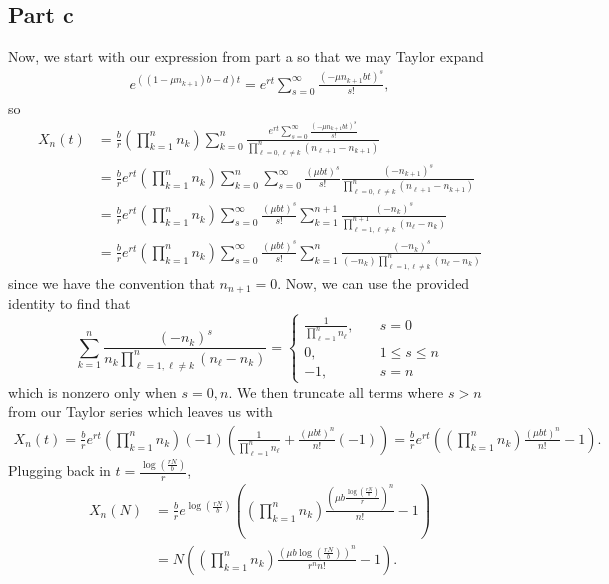 \documentclass{article}
\begin{document}
\subsection{Part c}
Now, we start with our expression from part a so that we may Taylor expand
\begin{align*}
e^{((1-\mu n_{k+1})b-d) t}=e^{rt}\sum_{s=0}^\infty\frac{(-\mu n_{k+1}bt)^s}{s!},
\end{align*}
so
\begin{align*}
X_n(t)&=\frac{b}{r}\left(\prod_{k=1}^{n}n_k\right)\sum_{k=0}^{n}\frac{e^{rt}\sum_{s=0}^\infty\frac{(-\mu n_{k+1}bt)^s}{s!}}{\prod_{\ell=0,\ell\neq k}^{n}(n_{\ell+1}-n_{k+1})}\\&=
\frac{b}{r}e^{rt}\left(\prod_{k=1}^{n}n_k\right)\sum_{k=0}^{n}\sum_{s=0}^\infty\frac{(\mu bt)^s}{s!}\frac{(-n_{k+1})^s}{\prod_{\ell=0,\ell\neq k}^{n}(n_{\ell+1}-n_{k+1})}\\&=
\frac{b}{r}e^{rt}\left(\prod_{k=1}^{n}n_k\right)\sum_{s=0}^\infty\frac{(\mu bt)^s}{s!}\sum_{k=1}^{n+1}\frac{(-n_{k})^s}{\prod_{\ell=1,\ell\neq k}^{n+1}(n_{\ell}-n_{k})}\\&=
\frac{b}{r}e^{rt}\left(\prod_{k=1}^{n}n_k\right)\sum_{s=0}^\infty\frac{(\mu bt)^s}{s!}\sum_{k=1}^{n}\frac{(-n_{k})^{s}}{(-n_k)\prod_{\ell=1,\ell\neq k}^{n}(n_{\ell}-n_{k})}
\end{align*}
since we have the convention that $n_{n+1}=0$. Now, we can use the provided identity to find that 
\[
\sum_{k=1}^{n}\frac{(-n_{k})^{s}}{n_k\prod_{\ell=1,\ell\neq k}^{n}(n_{\ell}-n_{k})}=\begin{cases}
	\frac{1}{\prod_{\ell=1}^{n}n_\ell}, \quad &s=0\\
	0, \quad &1\leq s\leq n\\
	-1, \quad &s=n
\end{cases}
\]
which is nonzero only when $s=0,n$. We then truncate all terms where $s>n$ from our Taylor series which leaves us with
\begin{align*}
X_n(t)=\frac{b}{r}e^{rt}\left(\prod_{k=1}^{n}n_k\right)(-1)\left(\frac{1}{\prod_{\ell=1}^{n}n_\ell}+\frac{(\mu bt)^n}{n!}(-1)\right)=\frac{b}{r}e^{rt}\left(\left(\prod_{k=1}^{n}n_k\right)\frac{(\mu bt)^n}{n!}-1\right).
\end{align*}
Plugging back in $t=\frac{\log\left(\frac{rN}{b}\right)}{r}$,
\begin{align*}
X_n(N)&=\frac{b}{r}e^{\log\left(\frac{rN}{b}\right)}\left(\left(\prod_{k=1}^{n}n_k\right)\frac{(\mu b\frac{\log\left(\frac{rN}{b}\right)}{r})^n}{n!}-1\right)\\&=
N\left(\left(\prod_{k=1}^{n}n_k\right)\frac{(\mu b\log\left(\frac{rN}{b}\right))^n}{r^n n!}-1\right).
\end{align*}
\end{document}
